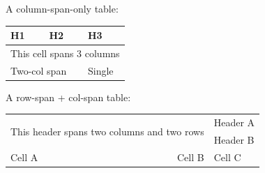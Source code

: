 A column-span-only table:

\begin{tabular}{lll}
\toprule
H1 & H2 & H3 \\
\midrule
\multicolumn{3}{l}{This cell spans 3 columns} \\
\multicolumn{2}{l}{Two-col span} & Single \\
\bottomrule
\end{tabular}

A row-span + col-span table:

\begin{tabular}{lrl}
\toprule
\multicolumn{2}{l}{\multirow{2}{*}{This header spans two columns and two rows       }} & Header A \\
\multicolumn{2}{c}{} & Header B \\
\midrule
Cell A & Cell B & Cell C \\
\bottomrule
\end{tabular}

